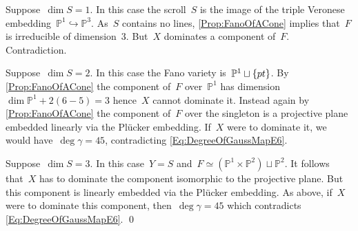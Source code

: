 \documentclass[a4paper]{amsart}
\newcommand{\bbP}{\mathbb{P}}
\newcommand{\into}{\hookrightarrow}
\newcommand{\iso}{\simeq}
\theoremstyle{plain}
\theoremstyle{definition}
\numberwithin{equation}{section}
\begin{document}
Suppose~$\dim S = 1$. In this case the scroll~$S$ is the image of the triple Veronese embedding~$\bbP^1 \into \bbP^3$. As~$S$ contains no lines, \cref{Prop:FanoOfACone} implies that~$F$ is irreducible of dimension~$3$. But~$X$ dominates a component of~$F$. Contradiction. \medskip

Suppose~$\dim S = 2$. In this case the Fano variety is~$\bbP^1 \sqcup \{ \textup{pt}\}$. By \cref{Prop:FanoOfACone} the component of~$F$ over~$\bbP^1$ has dimension~$\dim \bbP^1 + 2(6-5) = 3$ hence~$X$ cannot dominate it. Instead again by \cref{Prop:FanoOfACone} the component of~$F$ over the singleton is a projective plane embedded linearly via the Pl\"ucker embedding. If~$X$ were to dominate it, we would have~$\deg \gamma = 45$, contradicting \eqref{Eq:DegreeOfGaussMapE6}.\medskip

Suppose~$\dim S = 3$. In this case~$Y = S$ and~$F \iso (\bbP^1 \times \bbP^2) \sqcup \bbP^2$. It follows that~$X$ has to dominate the component isomorphic to the projective plane. But this component is linearly embedded via the Pl\"ucker embedding. As above, if~$X$ were to dominate this component, then~$\deg \gamma = 45$ which contradicts \eqref{Eq:DegreeOfGaussMapE6}.  \medskip
\qed
\end{document}
